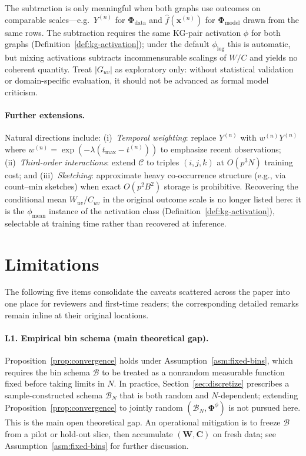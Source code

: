 \documentclass[11pt]{article}
\begin{document}
The subtraction is only meaningful when both graphs use outcomes on comparable scales---e.g.\ $Y^{(n)}$ for $\bm{\Phi}_{\mathrm{data}}$ and $\hat{f}(\bm{x}^{(n)})$ for $\bm{\Phi}_{\mathrm{model}}$ drawn from the same rows.
The subtraction requires the same KG-pair activation $\phi$ for both graphs (Definition~\ref{def:kg-activation}); under the default $\phi_{\log}$ this is automatic, but mixing activations subtracts incommensurable scalings of $W/C$ and yields no coherent quantity.
Treat $|G_{uv}|$ as exploratory only: without statistical validation or domain-specific evaluation, it should not be advanced as formal model criticism.

\paragraph{Further extensions.}
Natural directions include:
(i)~\emph{Temporal weighting}: replace $Y^{(n)}$ with $w^{(n)} Y^{(n)}$ where $w^{(n)} = \exp(-\lambda(t_{\max}-t^{(n)}))$ to emphasize recent observations;
(ii)~\emph{Third-order interactions}: extend $\mathcal{C}$ to triples $(i,j,k)$ at $O(p^3 N)$ training cost;
and (iii)~\emph{Sketching}: approximate heavy co-occurrence structure (e.g., via count--min sketches) when exact $O(p^2 B^2)$ storage is prohibitive.
Recovering the conditional mean $W_{uv}/C_{uv}$ in the original outcome scale is no longer listed here: it is the $\phi_{\mathrm{mean}}$ instance of the activation class (Definition~\ref{def:kg-activation}), selectable at training time rather than recovered at inference.

\section{Limitations}
\label{sec:limitations}

The following five items consolidate the caveats scattered across the paper into one place for reviewers and first-time readers; the corresponding detailed remarks remain inline at their original locations.

\paragraph{L1. Empirical bin schema (main theoretical gap).}
Proposition~\ref{prop:convergence} holds under Assumption~\ref{asm:fixed-bins}, which requires the bin schema $\mathcal{B}$ to be treated as a nonrandom measurable function fixed before taking limits in $N$.
In practice, Section~\ref{sec:discretize} prescribes a sample-constructed schema $\mathcal{B}_N$ that is both random and $N$-dependent; extending Proposition~\ref{prop:convergence} to jointly random $(\mathcal{B}_N, \bm{\Phi}^\phi)$ is not pursued here.
This is the main open theoretical gap.
An operational mitigation is to freeze $\mathcal{B}$ from a pilot or hold-out slice, then accumulate $(\bm{W}, \bm{C})$ on fresh data; see Assumption~\ref{asm:fixed-bins} for further discussion.
\end{document}
